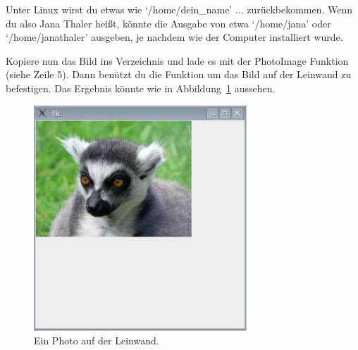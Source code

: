 \begin{LINUX}
Unter Linux wirst du etwas wie `/home/dein\_name' $\ldots$ zurückbekommen. Wenn du also Jana Thaler heißt, könnte die Ausgabe von  etwa `/home/jana' oder `/home/janathaler' ausgeben, je nachdem wie der Computer installiert wurde.
\end{LINUX}

Kopiere nun das Bild ins Verzeichnis und lade es mit der PhotoImage Funktion (siehe Zeile 5). Dann benützt du die  Funktion um das Bild auf der Leinwand zu befestigen. Das Ergebnis könnte wie in Abbildung~\ref{fig43} aussehen.

\begin{figure}
\begin{center}
\includegraphics[width=80mm]{images/figure43}
\end{center}
\caption{Ein Photo auf der Leinwand.}\label{fig43}
\end{figure}

